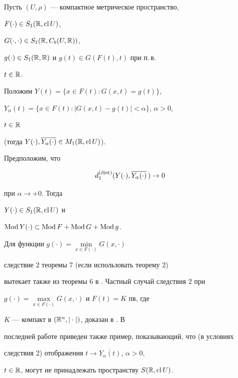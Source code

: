 \begin{cor}


Пусть $(U,\rho)$ --- компактное метрическое пространство,


$F(\cdot)\in S_1(\Bbb R,\operatorname{cl} U)$,


$G(\cdot,\cdot)\in S_1(\Bbb R,C_b(U,\Bbb R))$,


$g(\cdot)\in S_1(\Bbb R,\Bbb R)$ и $g(t)\in G(F(t),t)$ при п.\,в.


$t\in\Bbb R$.


Положим $Y(t)=\{x\in F(t):G(x,t)=g(t)\}$,


$Y_\alpha(t)=\{x\in F(t):|G(x,t)-g(t)|<\alpha\}$, $\alpha>0$,


$t\in\Bbb R$


(тогда $Y(\cdot),\overline{Y_\alpha(\cdot)}\in M_1(\Bbb R,\operatorname{cl} U)$).


Предположим, что


$$


d^{(\dist)}_1(Y(\cdot),\overline{Y_\alpha(\cdot)}\,)\to 0


$$


при $\alpha\to+0$. Тогда


$Y(\cdot)\in S_1(\Bbb R,\operatorname{cl} U)$ и


$\operatorname{Mod} Y(\cdot)\subset \operatorname{Mod} F+\operatorname{Mod} G+\operatorname{Mod} g$.


\end{cor}





Для функции $g(\cdot)=\min\limits_{x\in F(\cdot)}G(x,\cdot)$


следствие 2 теоремы 7 (если использовать теорему 2)


вытекает также из теоремы 6 в \cite{4}. Частный случай следствия 2 при


$g(\cdot)=\max\limits_{x\in F(\cdot)}G(x,\cdot)$ и $F(t)=K$ пв, где


$K$ --- компакт в $(\Bbb R^n,|\cdot|)$, доказан в \cite{18}. В


последней работе приведен также пример, показывающий, что (в условиях


следствия 2) отображения $t\to\overline{Y_\alpha(t)}$, $\alpha>0$,


$t\in\Bbb R$, могут не принадлежать пространству $S(\Bbb R,\operatorname{cl} U)$.





